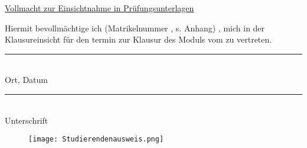 \documentclass[12pt,a4paper]{article}
\begin{document}
    \begin{center}
        \Large \underline{Vollmacht zur Einsichtnahme in Prüfungsunterlagen}
    \end{center}

    \vspace{1cm}
    Hiermit bevollmächtige ich (Matrikelnummer \MATRIKELNUMMER{}, s. Anhang)
    \BEVOLLMAECHTIGTER{}, mich in der Klausureinsicht für den \TERMIN{}termin zur
    Klausur des Moduls \MODULNAME{} vom \DATUM{} zu vertreten.

    \vspace{4cm}

    \begin{minipage}{0.5\textwidth}
        \begin{flushleft}
            \rule{4cm}{0.1mm}\\
            Ort, Datum
        \end{flushleft}
    \end{minipage}
    \hspace{2.5cm}
    \begin{minipage}{0.5\textwidth}
        \begin{flushleft}
            \rule{4cm}{0.1mm}\\
            Unterschrift
        \end{flushleft}
    \end{minipage}

    \vspace{9cm}



    \begin{figure}[h]
        \texttt{[image: Studierendenausweis.png]}
    \end{figure}
\end{document}
